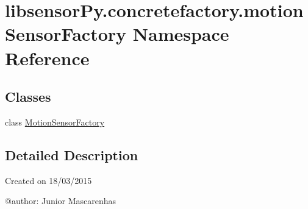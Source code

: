 \hypertarget{namespacelibsensorPy_1_1concretefactory_1_1motionSensorFactory}{}\section{libsensor\+Py.\+concretefactory.\+motion\+Sensor\+Factory Namespace Reference}
\label{namespacelibsensorPy_1_1concretefactory_1_1motionSensorFactory}
\subsection*{Classes}
\begin{DoxyCompactItemize}
\item 
class \hyperlink{classlibsensorPy_1_1concretefactory_1_1motionSensorFactory_1_1MotionSensorFactory}{Motion\+Sensor\+Factory}
\end{DoxyCompactItemize}


\subsection{Detailed Description}
\begin{DoxyVerb}Created on 18/03/2015

@author: Junior Mascarenhas
\end{DoxyVerb}
 